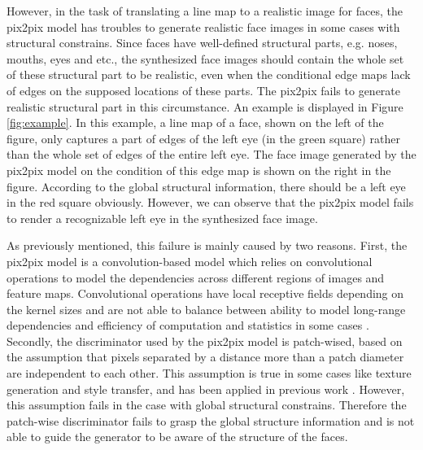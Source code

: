 However, in the task of translating a line map to a realistic image for faces, the pix2pix model has troubles to generate realistic face images in some cases with structural constrains. 
Since faces have well-defined structural parts, e.g. noses, mouths, eyes and etc., the synthesized face images should contain the whole set of these structural part to be realistic, even when the conditional edge maps lack of edges on the supposed locations of these parts. The pix2pix fails to generate realistic structural part in this circumstance.
An example is displayed in Figure \ref{fig:example}. 
In this example, a line map of a face, shown on the left of the figure, only captures a part of edges of the left eye (in the green square) rather than the whole set of edges of the entire left eye. The face image generated by the pix2pix model on the condition of this edge map is shown on the right in the figure. According to the global structural information, there should be a left eye in the red square obviously. However, we can observe that the pix2pix model fails to render a recognizable left eye in the synthesized face image. 

As previously mentioned, this failure is mainly caused by two reasons. 
First, the pix2pix model is a convolution-based model which relies on convolutional operations to model the dependencies across different regions of images and feature maps. Convolutional operations have local receptive fields depending on the kernel sizes and are not able to balance between ability to model long-range dependencies and efficiency of computation and statistics in some cases \cite{SAGANs}. 
Secondly, the discriminator used by the pix2pix model is patch-wised, based on the assumption that pixels separated by a distance more than a patch diameter are independent to each other. This assumption is true in some cases like texture generation and style transfer, and has been applied in previous work \cite{texture_markovian, styel_transfer}. However, this assumption fails in the case with global structural constrains. Therefore the patch-wise discriminator fails to grasp the global structure information and is not able to guide the generator to be aware of the structure of the faces.

